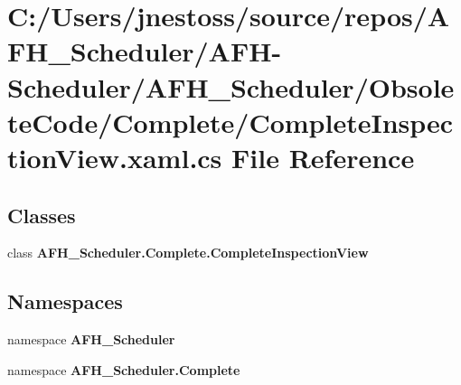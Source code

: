 \section{C\+:/\+Users/jnestoss/source/repos/\+A\+F\+H\+\_\+\+Scheduler/\+A\+F\+H-\/\+Scheduler/\+A\+F\+H\+\_\+\+Scheduler/\+Obsolete\+Code/\+Complete/\+Complete\+Inspection\+View.xaml.\+cs File Reference}
\label{_complete_inspection_view_8xaml_8cs}
\subsection*{Classes}
\begin{DoxyCompactItemize}
\item 
class \textbf{ A\+F\+H\+\_\+\+Scheduler.\+Complete.\+Complete\+Inspection\+View}
\end{DoxyCompactItemize}
\subsection*{Namespaces}
\begin{DoxyCompactItemize}
\item 
namespace \textbf{ A\+F\+H\+\_\+\+Scheduler}
\item 
namespace \textbf{ A\+F\+H\+\_\+\+Scheduler.\+Complete}
\end{DoxyCompactItemize}
